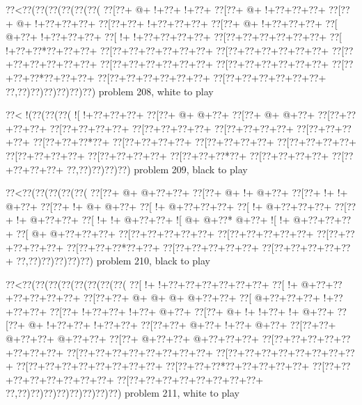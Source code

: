 \vbox{\vbox{\goo
\0??<\0??(\0??(\0??(\0??(\0??(\0??(
\0??[\0??+\- @+\- !+\0??+\- !+\0??+
\0??[\0??+\- @+\- !+\0??+\0??+\0??+
\0??[\0??+\- @+\- !+\0??+\0??+\0??+
\0??[\0??+\0??+\- !+\0??+\0??+\0??+
\0??[\0??+\- @+\- !+\0??+\0??+\0??+
\0??[\- @+\0??+\- !+\0??+\0??+\0??+
\0??[\- !+\- !+\0??+\0??+\0??+\0??+
\0??[\0??+\0??+\0??+\0??+\0??+\0??+
\0??[\- !+\0??+\0??*\0??+\0??+\0??+
\0??[\0??+\0??+\0??+\0??+\0??+\0??+
\0??[\0??+\0??+\0??+\0??+\0??+\0??+
\0??[\0??+\0??+\0??+\0??+\0??+\0??+
\0??[\0??+\0??+\0??+\0??+\0??+\0??+
\0??[\0??+\0??+\0??+\0??+\0??+\0??+
\0??[\0??+\0??+\0??*\0??+\0??+\0??+
\0??[\0??+\0??+\0??+\0??+\0??+\0??+
\0??[\0??+\0??+\0??+\0??+\0??+\0??+
\0??,\0??)\0??)\0??)\0??)\0??)\0??)
}
\hfil problem 208, white to play\hfil\break
}

\vbox{\vbox{\goo
\0??<\- !(\0??(\0??(\0??(
\- ![\- !+\0??+\0??+\0??+
\0??[\0??+\- @+\- @+\0??+
\0??[\0??+\- @+\- @+\0??+
\0??[\0??+\0??+\0??+\0??+
\0??[\0??+\0??+\0??+\0??+
\0??[\0??+\0??+\0??+\0??+
\0??[\0??+\0??+\0??+\0??+
\0??[\0??+\0??+\0??+\0??+
\0??[\0??+\0??+\0??*\0??+
\0??[\0??+\0??+\0??+\0??+
\0??[\0??+\0??+\0??+\0??+
\0??[\0??+\0??+\0??+\0??+
\0??[\0??+\0??+\0??+\0??+
\0??[\0??+\0??+\0??+\0??+
\0??[\0??+\0??+\0??*\0??+
\0??[\0??+\0??+\0??+\0??+
\0??[\0??+\0??+\0??+\0??+
\0??,\0??)\0??)\0??)\0??)
}
\hfil problem 209, black to play\hfil\break
}

\vbox{\vbox{\goo
\0??<\0??(\0??(\0??(\0??(\0??(
\0??[\0??+\- @+\- @+\0??+\0??+
\0??[\0??+\- @+\- !+\- @+\0??+
\0??[\0??+\- !+\- !+\- @+\0??+
\0??[\0??+\- !+\- @+\- @+\0??+
\0??[\- !+\- @+\0??+\0??+\0??+
\0??[\- !+\- @+\0??+\0??+\0??+
\0??[\0??+\- !+\- @+\0??+\0??+
\0??[\- !+\- !+\- @+\0??+\0??+
\- ![\- @+\- @+\0??*\- @+\0??+
\- ![\- !+\- @+\0??+\0??+\0??+
\0??[\- @+\- @+\0??+\0??+\0??+
\0??[\0??+\0??+\0??+\0??+\0??+
\0??[\0??+\0??+\0??+\0??+\0??+
\0??[\0??+\0??+\0??+\0??+\0??+
\0??[\0??+\0??+\0??*\0??+\0??+
\0??[\0??+\0??+\0??+\0??+\0??+
\0??[\0??+\0??+\0??+\0??+\0??+
\0??,\0??)\0??)\0??)\0??)\0??)
}
\hfil problem 210, black to play\hfil\break
}

\vbox{\vbox{\goo
\0??<\0??(\0??(\0??(\0??(\0??(\0??(\0??(\0??(
\0??[\- !+\- !+\0??+\0??+\0??+\0??+\0??+\0??+
\0??[\- !+\- @+\0??+\0??+\0??+\0??+\0??+\0??+
\0??[\0??+\0??+\- @+\- @+\- @+\- @+\0??+\0??+
\0??[\- @+\0??+\0??+\0??+\- !+\0??+\0??+\0??+
\0??[\0??+\- !+\0??+\0??+\- !+\0??+\- @+\0??+
\0??[\0??+\- @+\- !+\- !+\0??+\- !+\- @+\0??+
\0??[\0??+\- @+\- !+\0??+\0??+\- !+\0??+\0??+
\0??[\0??+\0??+\- @+\0??+\- !+\0??+\- @+\0??+
\0??[\0??+\0??+\- @+\0??+\0??+\- @+\0??+\0??+
\0??[\0??+\- @+\0??+\0??+\- @+\0??+\0??+\0??+
\0??[\0??+\0??+\0??+\0??+\0??+\0??+\0??+\0??+
\0??[\0??+\0??+\0??+\0??+\0??+\0??+\0??+\0??+
\0??[\0??+\0??+\0??+\0??+\0??+\0??+\0??+\0??+
\0??[\0??+\0??+\0??+\0??+\0??+\0??+\0??+\0??+
\0??[\0??+\0??+\0??*\0??+\0??+\0??+\0??+\0??+
\0??[\0??+\0??+\0??+\0??+\0??+\0??+\0??+\0??+
\0??[\0??+\0??+\0??+\0??+\0??+\0??+\0??+\0??+
\0??,\0??)\0??)\0??)\0??)\0??)\0??)\0??)\0??)
}
\hfil problem 211, white to play\hfil\break
}


